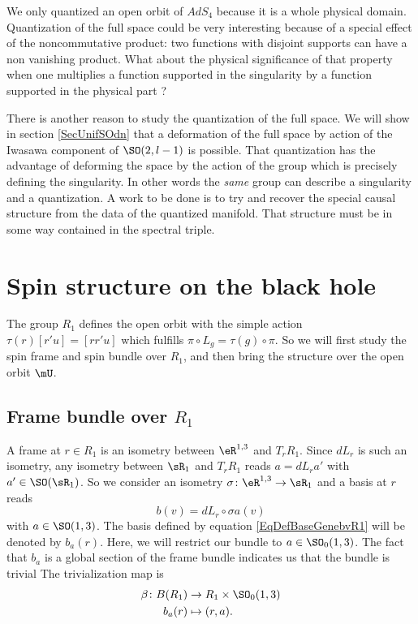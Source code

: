 We only quantized an open orbit of $AdS_4$ because it is a whole physical domain. Quantization of the full space could be very interesting because of a special effect of the noncommutative product: two functions with disjoint supports can have a non vanishing product. What about the physical significance of that property when one multiplies a function supported in the singularity by a function supported in the physical part ?

There is another reason to study the quantization of the full space. We will show in section \ref{SecUnifSOdn} that a deformation of the full space by action of the Iwasawa component of $\SO(2,l-1)$ is possible. That quantization has the advantage of deforming the space by the action of the group which is precisely defining the singularity. In other words the \emph{same} group can describe a singularity and a quantization. A work to be done is to try and recover the special causal structure from the data of the quantized manifold. That structure must be in some way contained in the spectral triple. 


\section{Spin structure on the black hole}

The group $R_1$ defines the open orbit with the simple action $\tau(r)[r'u]=[rr'u]$ which fulfills $\pi\circ L_g=\tau(g)\circ\pi$. So we will first study the spin frame and spin bundle over $R_1$, and then bring the structure over the open orbit $\mU$.

\subsection{Frame bundle over \texorpdfstring{$R_1$}{R1}}

A frame at $r\in R_1$ is an isometry between $\eR^{1,3}$ and $T_rR_1$. Since $dL_r$ is such an isometry, any isometry between $\sR_1$ and $T_rR_1$ reads $a=dL_ra'$ with $a'\in\SO(\sR_1)$. So we consider an isometry $\sigma\colon \eR^{1,3}\to \sR_1$ and a basis at $r$ reads
\begin{equation}   \label{EqDefBaseGenebvR1}
	b(v)=dL_r\circ\sigma a(v)
\end{equation}
with $a\in \SO(1,3)$. The basis defined by equation \eqref{EqDefBaseGenebvR1} will be denoted by $b_a(r)$. Here, we will restrict our bundle to $a\in \SO_0(1,3)$. The fact that $b_a$ is a global section of the frame bundle indicates us that the bundle is trivial The trivialization map is 
\begin{equation}
\begin{aligned}
 \beta\colon B(R_1)&\to R_1\times \SO_0(1,3) \\ 
b_a(r)&\mapsto (r,a). 
\end{aligned}
\end{equation}


